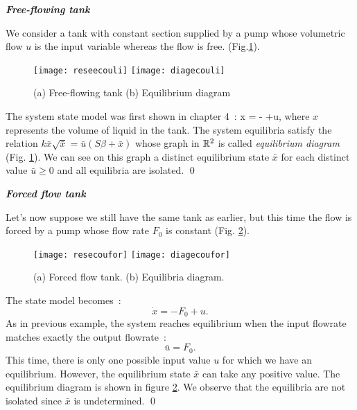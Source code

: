 \begin{exemple}{\bf{\em Free-flowing tank}}
 
 We consider a tank with constant section supplied by a pump whose volumetric flow
 $u$ is the input variable whereas the flow is free. (Fig.\ref{fig:diagecouli}). 
\begin{figure}[h] 
\begin{center}
\texttt{[image: reseecouli]}
\hspace{1cm}
\texttt{[image: diagecouli]}
\caption{(a) Free-flowing tank (b) Equilibrium diagram}
\label{fig:diagecouli}
\end{center} 
\end{figure}

The system state model was first shown in chapter 4~:
\eqnn
\dot x = -  +u,
\eeqnn
where $x$ represents the volume of liquid in the tank.
The system equilibria satisfy the relation $k \bar x \sqrt{\bar
x} = \bar u (S \beta + \bar x)$ whose graph in $\mathbb{R}^2$ is called {\em
equilibrium diagram} (Fig. \ref{fig:diagecouli}).
We can see on this graph a distinct equilibrium state $\bar x$ for each distinct value $\bar u \geq 0$ and all equilibria are isolated. \qed
\end{exemple}
\vv

\begin{exemple}{\bf{\em Forced flow tank}}

Let's now suppose we still have the same tank as earlier, 
but this time the flow is forced by a pump 
whose flow rate $F_0$ is constant (Fig. \ref{fig:diagecoufor}).
\begin{figure}[ht]
\begin{center}
\texttt{[image: resecoufor]}
\hspace{1cm}
\texttt{[image: diagecoufor]}
\caption{(a) Forced flow tank. (b) Equilibria diagram.}
\label{fig:diagecoufor}
\end{center} 
\end{figure}
The state model becomes~:
$$\dot x=-F_0 + u.$$
As in previous example, the system reaches equilibrium when the input
flowrate matches exactly the output flowrate~:
$$\bar u=F_0.$$
This time, there is only one possible input value $u$ for which we have an equilibrium.
However, the equilibrium state
$\bar x$ can take any positive value. The equilibrium diagram is shown in figure \ref{fig:diagecoufor}. We observe that the equilibria are not isolated since $\bar x$ is 
undetermined. \qed
\end{exemple}
\vv

